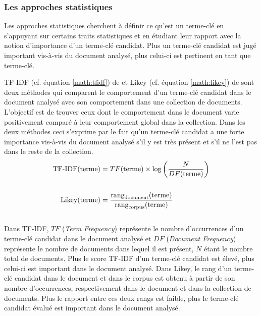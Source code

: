       \subsubsection{Les approches statistiques}
      \label{subsubsec:main-state_of_the_art-automatic_keyphrase_extraction-unsupervised_keyphrase_extraction-statistical_approaches}
        Les approches statistiques cherchent à définir ce qu'est un terme-clé en s'appuyant sur certains
        traits statistiques et en étudiant leur rapport avec la notion
        d'importance d'un terme-clé candidat. Plus un terme-clé candidat est
        jugé important vis-à-vis du document analysé, plus celui-ci est
        pertinent en tant que terme-clé.

        TF-IDF (cf. équation \ref{math:tfidf}) de  et
        Likey (cf. équation \ref{math:likey}) de 
        sont deux méthodes qui comparent le comportement d'un terme-clé
        candidat dans le document analysé avec son comportement dans une
        collection de documents. L'objectif est de trouver ceux dont le
        comportement dans le document varie positivement comparé à leur
        comportement global dans la collection. Dans les deux méthodes ceci
        s'exprime par le fait qu'un terme-clé candidat a une forte importance
        vis-à-vis du document analysé s'il y est très présent et s'il ne l'est
        pas dans le reste de la collection.
        \begin{align}
          \text{TF-IDF}(\text{terme}) &= TF(\text{terme}) \times \log\left(\frac{N}{DF(\text{terme})}\right) \label{math:tfidf}\\
          \notag\\
          \text{Likey}(\text{terme}) &= \frac{\text{rang}_{\text{document}}(\text{terme})}{\text{rang}_{\text{corpus}}(\text{terme})} \label{math:likey}
        \end{align}\\
        Dans TF-IDF, $TF$ (\textit{Term Frequency}) représente le nombre
        d'occurrences d'un terme-clé candidat dans le document analysé et $DF$
        (\textit{Document Frequency}) représente le nombre de documents dans
        lequel il est présent, $N$ étant le nombre total de documents. Plus le
        score TF-IDF d'un terme-clé candidat est élevé, plus celui-ci est
        important dans le document analysé. Dans Likey, le rang d'un terme-clé
        candidat dans le document et dans le corpus est obtenu à partir de son
        nombre d'occurrences, respectivement dans le document et dans la
        collection de documents. Plus le rapport entre ces deux rangs est
        faible, plus le terme-clé candidat évalué est important dans le
        document analysé.

